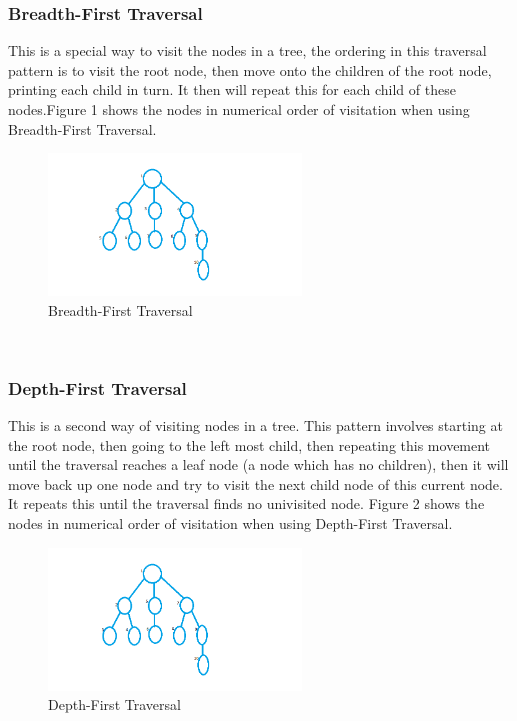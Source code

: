 \documentclass[10pt,twocolumn]{IEEEtran}
\begin{document}
\subsubsection{Breadth-First Traversal}
This is a special way to visit the nodes in a tree, the ordering in this traversal pattern is to visit the root node, then move onto the children of the root node, printing each child in turn. It then will repeat this for each child of these nodes.Figure 1 shows the nodes in numerical order of visitation when using Breadth-First Traversal. \\
\begin{figure}[h]
\includegraphics[width=0.6\textwidth]{bfs.png}
\caption{Breadth-First Traversal}
\end{figure}
 \\
\subsubsection{Depth-First Traversal}
This is a second way of visiting nodes in a tree. This pattern involves starting at the root node, then going to the left most child, then repeating this movement until the traversal reaches a leaf node (a node which has no children), then it will move back up one node and try to visit the next child node of this current node. It repeats this until the traversal finds no univisited node. Figure 2 shows the nodes in numerical order of visitation when using Depth-First Traversal. 
\begin{figure}[h]
\includegraphics[width=0.6\textwidth]{dfs.png}
\caption{Depth-First Traversal}
\end{figure}
\end{document}
